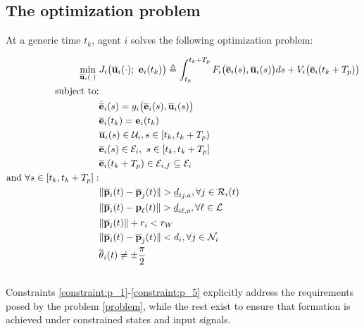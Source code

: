 \subsection{The optimization problem}

At a generic time $t_k$, agent $i$ solves the following optimization problem:

\begin{align}
  \min\limits_{\overline{\bm{\mathbf{u}}}_i (\cdot)}\ &
    J_i \big(\overline{\bm{\mathbf{u}}}_i (\cdot);\ \bm{\mathbf{e}}_i(t_k)\big) \triangleq
      \int_{t_k}^{t_k + T_p} F_i \big(\overline{\bm{\mathbf{e}}}_i(s), \overline{\bm{\mathbf{u}}}_i (s)\big) ds +
      V_i \big(\overline{\bm{\mathbf{e}}}_i (t_k + T_p)\big) \label{position_based_cost} \\
  \text{subject to:} & \nonumber \\
  & \dot{\overline{\bm{\mathbf{e}}}}_i(s) = g_i \big(\overline{\bm{\mathbf{e}}}_i (s), \overline{\bm{\mathbf{u}}}_i (s)\big) \\
  & \overline{\bm{\mathbf{e}}}_i (t_k) = \bm{\mathbf{e}}_i (t_k) \\
  & \overline{\bm{\mathbf{u}}}_i(s) \in \mathcal{U}_i, s \in [t_k, t_k + T_p)\\
  & \overline{\bm{\mathbf{e}}}_i (s) \in \mathcal{E}_i,\ s \in [t_k, t_k + T_p]\\
  & \overline{\bm{\mathbf{e}}}_i (t_k + T_p) \in \mathcal{E}_{i,f} \subseteq \mathcal{E}_i \\
  \text{and } \forall s \in [t_k, t_k + T_p]:& \nonumber \\
  & \|\overline{\bm{\mathbf{p}}}_i(t) - \overline{\bm{\mathbf{p}}}_j(t)\| > \underline{d}_{ij,a}, \forall j \in \mathcal{R}_i(t) \label{constraint:p_1}\\
  & \|\overline{\bm{\mathbf{p}}}_i(t) - \bm{\mathbf{p}}_{\ell}(t)\| > \underline{d}_{i\ell,o}, \forall \ell \in \mathcal{L} \\
  & \|\overline{\bm{\mathbf{p}}}_i(t)\| + r_i < r_W \\
  & \|\overline{\bm{\mathbf{p}}}_i(t) - \overline{\bm{\mathbf{p}}}_j(t)\| < d_i, \forall j \in \mathcal{N}_i \\
  & \overline{\theta}_i(t) \ne \pm \frac{\pi}{2} \label{constraint:p_5}
\end{align}\\
Constraints \ref{constraint:p_1}-\ref{constraint:p_5} explicitly address the
requirements posed by the problem \eqref{problem}, while the rest exist to
ensure that formation is achieved under constrained states and input signals.

